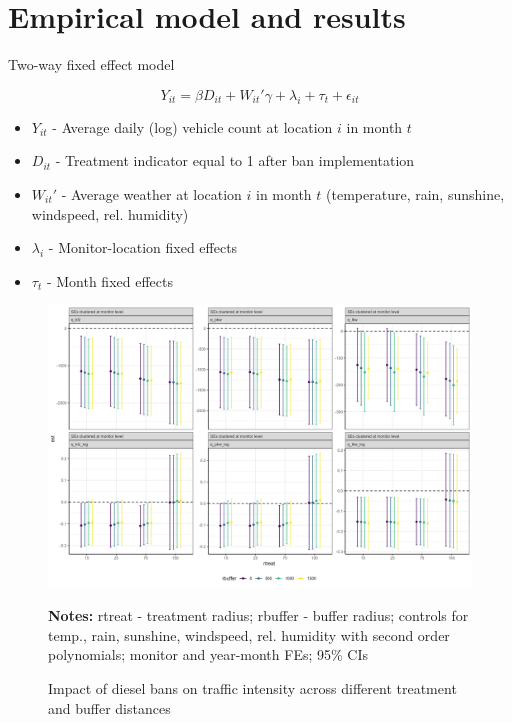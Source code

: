 \documentclass[a4paper, 10pt]{article}
\newcommand{\notes}[1]{\vspace{0.2cm} \caption*{ \scriptsize \textbf{Notes:} {#1}} }
\begin{document}
\section{Empirical model and results}

Two-way fixed effect model

\begin{equation}
Y_{it} = \beta D_{it} + W_{it}'\gamma + \lambda_i + \tau_t + \epsilon_{it}
\end{equation}

\begin{itemize}
	\item $Y_{it}$ - Average daily (log) vehicle count at location $i$ in month $t$
	\item $D_{it}$ - Treatment indicator equal to 1 after ban implementation
	\item $W_{it}'$ - Average weather at location $i$ in month $t$ (temperature, rain, sunshine, windspeed, rel. humidity)
	\item $\lambda_i$ - Monitor-location fixed effects
	\item $\tau_t$ - Month fixed effects
\end{itemize}


%

%
%
%
\begin{figure}[H]
\centering
\caption{Impact of diesel bans on traffic intensity across different treatment and buffer distances}
\includegraphics[width = \textwidth]{../04_figures/twfe_monthly_bancities_treatrad_bufferrad.png} 
\notes{rtreat - treatment radius; rbuffer - buffer radius; controls for temp., rain, sunshine, windspeed, rel. humidity with second order polynomials; monitor and year-month FEs; 95\% CIs}
\end{figure}
\end{document}
